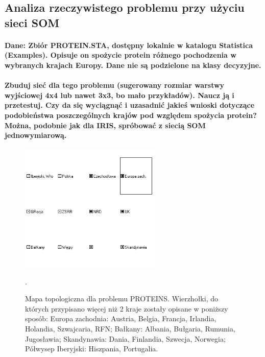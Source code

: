 \subsection{ Analiza rzeczywistego problemu przy użyciu sieci SOM}

 \paragraph{\textbf{Dane: Zbiór PROTEIN.STA, dostępny lokalnie w katalogu Statistica (Examples). Opisuje on spożycie protein różnego pochodzenia w wybranych krajach Europy. Dane nie są podzielone na klasy decyzyjne.}}
 \paragraph{\textbf{Zbuduj sieć dla tego problemu (sugerowany rozmiar warstwy wyjściowej 4x4 lub nawet 3x3, bo mało przykładów). Naucz ją i przetestuj. Czy da się wyciągnąć i uzasadnić jakieś wnioski dotyczące podobieństwa poszczególnych krajów pod względem spożycia protein? Można, podobnie jak dla IRIS, spróbować z siecią SOM jednowymiarową.}}

\begin{figure}[h]
\begin{centering}
\includegraphics[width=0.6\textwidth]{dane/part3/zad2/proteins12}
\caption{Mapa topologiczna dla problemu PROTEINS. Wierzhołki, do których przypisano więcej niż 2 kraje zostały opisane w poniższy sposób: Europa zachodnia: Austria, Belgia, Francja, Irlandia, Holandia, Szwajcaria, RFN; Bałkany: Albania, Bułgaria, Rumunia, Jugosławia; Skandynawia: Dania, Finlandia, Szwecja, Norwegia; Półwysep Iberyjski: Hiszpania, Portugalia.\label{fig:proteins12}}.
\end{centering}
\end{figure}

